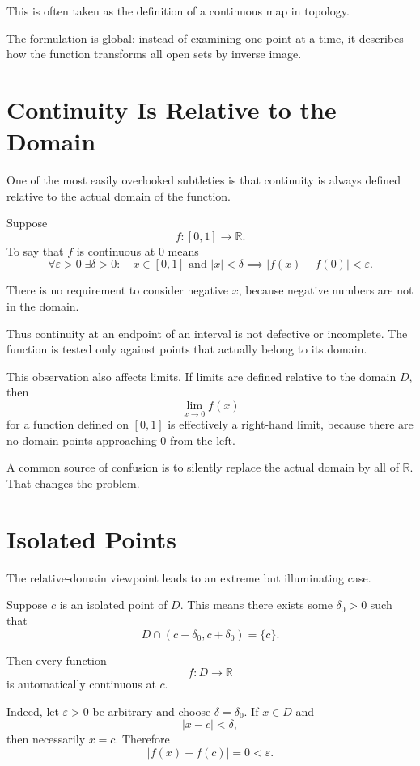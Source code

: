 \documentclass{essay}
\begin{document}
This is often taken as the definition of a continuous map in topology.

The formulation is global: instead of examining one point at a time, it describes how the function transforms all open sets by inverse image.

\section{Continuity Is Relative to the Domain}

One of the most easily overlooked subtleties is that continuity is always defined relative to the actual domain of the function.

Suppose
\[ f:[0,1]\to\mathbb{R}. \]
To say that \(f\) is continuous at \(0\) means
\[ \forall\varepsilon>0\;\exists\delta>0: \quad x\in[0,1] \text{ and } |x|<\delta \implies |f(x)-f(0)|<\varepsilon. \]

There is no requirement to consider negative \(x\), because negative numbers are not in the domain.

Thus continuity at an endpoint of an interval is not defective or incomplete. The function is tested only against points that actually belong to its domain.

This observation also affects limits. If limits are defined relative to the domain \(D\), then
\[ \lim_{x\to 0}f(x) \]
for a function defined on \([0,1]\) is effectively a right-hand limit, because there are no domain points approaching \(0\) from the left.

A common source of confusion is to silently replace the actual domain by all of \(\mathbb{R}\). That changes the problem.

\section{Isolated Points}

The relative-domain viewpoint leads to an extreme but illuminating case.

Suppose \(c\) is an isolated point of \(D\). This means there exists some \(\delta_{0}>0\) such that
\[ D\cap(c-\delta_{0},c+\delta_{0})=\{c\}. \]

Then every function
\[ f:D\to\mathbb{R} \]
is automatically continuous at \(c\).

Indeed, let \(\varepsilon>0\) be arbitrary and choose \(\delta=\delta_{0}\). If \(x\in D\) and
\[ |x-c|<\delta, \]
then necessarily \(x=c\). Therefore
\[ |f(x)-f(c)|=0<\varepsilon. \]
\end{document}
